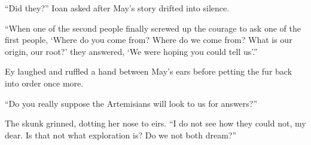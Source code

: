 ``Did they?'' Ioan asked after May's story drifted into silence.

``When one of the second people finally screwed up the courage to ask one of the first people, `Where do you come from? Where do we come from? What is our origin, our root?' they answered, `We were hoping you could tell us'.''

Ey laughed and ruffled a hand between May's ears before petting the fur back into order once more.

``Do you really suppose the Artemisians will look to us for answers?''

The skunk grinned, dotting her nose to eirs. ``I do not see how they could not, my dear. Is that not what exploration is? Do we not both dream?''
